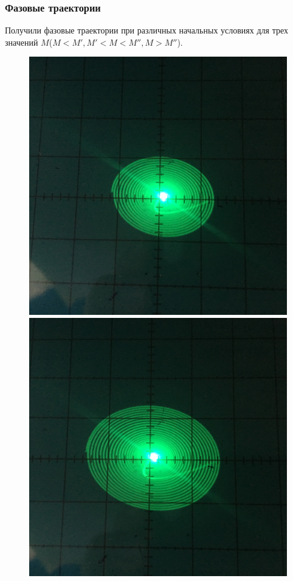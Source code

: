 \subsubsection{Фазовые траектории}
Получили фазовые траектории при различных начальных условиях для трех значений $M$($M<M',M'<M<M'',M>M''$).
\begin{figure}[h]
	\centering
	\begin{minipage}{0.32\linewidth}
	\includegraphics[width=\linewidth]{photo/task2c(lefts).jpg}
	\end{minipage}
	\begin{minipage}{0.32\linewidth}
	\includegraphics[width=\linewidth]{photo/task2c(leftm).jpg}

\end{minipage}
\end{figure}
